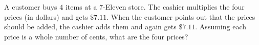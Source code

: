 A customer buys $4$ items at a 7-Eleven store. The cashier multiplies the four prices (in dollars) and gets $\$7.11$. When the customer points out that the prices should be added, the cashier adds them and again gets $\$7.11$. Assuming each price is a whole number of cents, what are the four prices?
